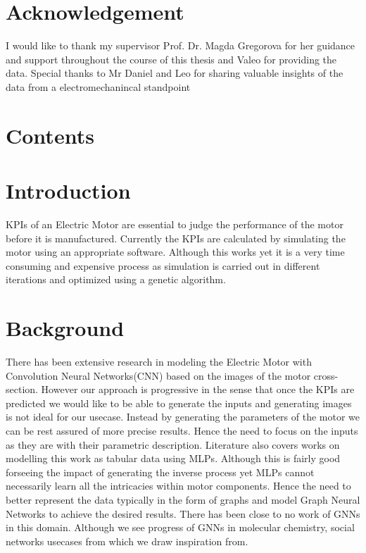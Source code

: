 \documentclass[a4paper,12pt]{article}
\begin{document}
\newpage 

\section*{Acknowledgement}
I would like to thank my supervisor Prof. Dr. Magda Gregorova for her guidance and support throughout the course of this thesis and Valeo for providing the data.
Special thanks to Mr Daniel and Leo for sharing valuable insights of the data from a electromechanincal standpoint

\newpage

\newpage

\section*{Contents} 

\newpage

\newpage

\section*{Introduction} 
KPIs of an Electric Motor are essential to judge the performance of the motor before it is manufactured. 
Currently the KPIs are calculated by simulating the motor using an appropriate software. 
Although this works yet it is a very time consuming and expensive process as simulation is carried out in different iterations and optimized using a genetic algorithm.

\newpage 

\section*{Background} 
There has been extensive research in modeling the Electric Motor with Convolution Neural Networks(CNN) based on the images of the motor cross-section. 
However our approach is progressive in the sense that once the KPIs are predicted we would like to be able to generate the inputs and generating images is not ideal for our usecase.
Instead by generating the parameters of the motor we can be rest assured of more precise results. Hence the need to focus on the inputs as they are with their parametric description.
Literature also covers works on modelling this work as tabular data using MLPs. Although this is fairly good forseeing the impact of generating the inverse process yet MLPs cannot necessarily learn all the intricacies within motor components.
Hence the need to better represent the data typically in the form of graphs and model Graph Neural Networks to achieve the desired results. There has been close to no work of GNNs in this domain.
Although we see progress of GNNs in molecular chemistry, social networks usecases from which we draw inspiration from.
\end{document}
